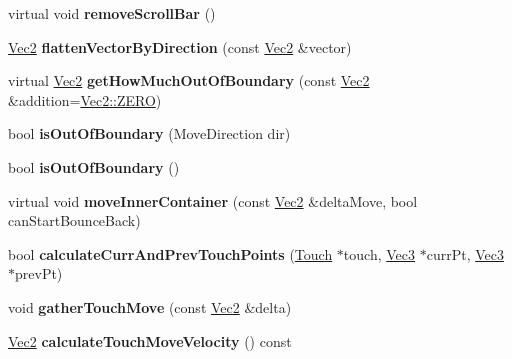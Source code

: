 \begin{DoxyCompactItemize}
virtual void {\bfseries remove\+Scroll\+Bar} ()
\item 
\mbox{\label{classui_1_1ScrollView_a7c10919beb209593e26dcd465a2447f3}} 
\hyperlink{classVec2}{Vec2} {\bfseries flatten\+Vector\+By\+Direction} (const \hyperlink{classVec2}{Vec2} \&vector)
\item 
\mbox{\label{classui_1_1ScrollView_a3ca62e76441d230eb6b08533f305a906}} 
virtual \hyperlink{classVec2}{Vec2} {\bfseries get\+How\+Much\+Out\+Of\+Boundary} (const \hyperlink{classVec2}{Vec2} \&addition=\hyperlink{classVec2_a5c80e2e7c8bd2adcbad2844d060e6245}{Vec2\+::\+Z\+E\+RO})
\item 
\mbox{\label{classui_1_1ScrollView_ae2e5c52e88bd121d28d248153dd787ac}} 
bool {\bfseries is\+Out\+Of\+Boundary} (Move\+Direction dir)
\item 
\mbox{\label{classui_1_1ScrollView_afa0c15d0004995bdef21fc6e93e61b41}} 
bool {\bfseries is\+Out\+Of\+Boundary} ()
\item 
\mbox{\label{classui_1_1ScrollView_af59d96dc62ed74f7b6646eec333aa55b}} 
virtual void {\bfseries move\+Inner\+Container} (const \hyperlink{classVec2}{Vec2} \&delta\+Move, bool can\+Start\+Bounce\+Back)
\item 
\mbox{\label{classui_1_1ScrollView_ac8f04d301c83c306193ea4ceaa7284ac}} 
bool {\bfseries calculate\+Curr\+And\+Prev\+Touch\+Points} (\hyperlink{classTouch}{Touch} $\ast$touch, \hyperlink{classVec3}{Vec3} $\ast$curr\+Pt, \hyperlink{classVec3}{Vec3} $\ast$prev\+Pt)
\item 
\mbox{\label{classui_1_1ScrollView_a4d2babcb2720c73625954343497746a2}} 
void {\bfseries gather\+Touch\+Move} (const \hyperlink{classVec2}{Vec2} \&delta)
\item 
\mbox{\label{classui_1_1ScrollView_a1abdbef5dfbb6eae8130c258868fcef6}} 
\hyperlink{classVec2}{Vec2} {\bfseries calculate\+Touch\+Move\+Velocity} () const
\item 
\mbox{\label{classui_1_1ScrollView_a25489430a62ef5c311504fba6316c4f5}} 

\end{DoxyCompactItemize}
